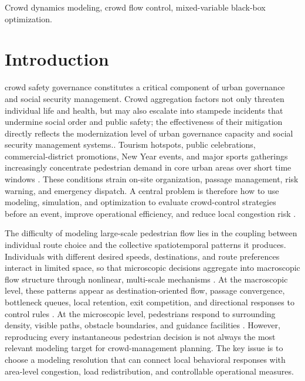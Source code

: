 \documentclass[lettersize,journal]{IEEEtran}
\begin{document}
\begin{IEEEkeywords}
Crowd dynamics modeling, crowd flow control, mixed-variable black-box optimization.
\end{IEEEkeywords}

\section{Introduction}
\label{sec:introduction}

 crowd safety governance constitutes a critical component of urban governance and social security management. Crowd aggregation factors not only threaten individual life and health, but may also escalate into stampede incidents that undermine social order and public safety; the effectiveness of their mitigation directly reflects the modernization level of urban governance capacity and social security management systems.\cite{RN2147,RN1998}. Tourism hotspots, public celebrations, commercial-district promotions, New Year events, and major sports gatherings increasingly concentrate pedestrian demand in core urban areas over short time windows \cite{RN2154,RN1193,RN673}. These conditions strain on-site organization, passage management, risk warning, and emergency dispatch. A central problem is therefore how to use modeling, simulation, and optimization to evaluate crowd-control strategies before an event, improve operational efficiency, and reduce local congestion risk \cite{RN1226,RN2059}.

The difficulty of modeling large-scale pedestrian flow lies in the coupling between individual route choice and the collective spatiotemporal patterns it produces. Individuals with different desired speeds, destinations, and route preferences interact in limited space, so that microscopic decisions aggregate into macroscopic flow structure through nonlinear, multi-scale mechanisms \cite{RN1193,RN1100}. At the macroscopic level, these patterns appear as destination-oriented flow, passage convergence, bottleneck queues, local retention, exit competition, and directional responses to control rules \cite{RN2056,RN2102}. At the microscopic level, pedestrians respond to surrounding density, visible paths, obstacle boundaries, and guidance facilities \cite{RN2174}. However, reproducing every instantaneous pedestrian decision is not always the most relevant modeling target for crowd-management planning. The key issue is to choose a modeling resolution that can connect local behavioral responses with area-level congestion, load redistribution, and controllable operational measures.
\end{document}
